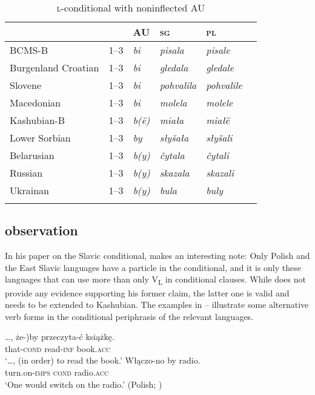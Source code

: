 \documentclass[output=paper]{langscibook}
\begin{document}
\begin{table}[t]
\begin{tabular}{llllll}
\lsptoprule
& & AU & \textsc{sg} & \textsc{pl} \\ 
\midrule 
BCMS-B & 1--3 & \textit{bi} & \textit{pisala} & \textit{pisale} \\
Burgenland Croatian & 1--3 & \textit{bi} & \textit{gledala} & \textit{gledale} \\
Slovene & 1--3 & \textit{bi} & \textit{pohvalila} & \textit{pohvalile} \\
Macedonian & 1--3 & \textit{bi} & \textit{molela} & \textit{molele} \\\addlinespace
Kashubian-B & 1--3 & \textit{b(ë)} & \textit{miała} & \textit{miałë} \\
Lower Sorbian & 1--3 & \textit{by} & \textit{słyšała} & \textit{słyšali} \\\addlinespace
Belarusian & 1--3 & \textit{b(y)} & \textit{čytala} & \textit{čytali} \\
Russian & 1--3 & \textit{b(y)}  & \textit{skazala} & \textit{skazali} \\
Ukrainan & 1--3 & \textit{b(y)} & \textit{bula} & \textit{buly} \\ 
\lspbottomrule
\end{tabular}
    \caption{\textsc{l-}conditional with noninflected AU}
    \label{pitsch:tab:conditional_particle}
\end{table}


\subsection{ observation}

In his paper on the Slavic conditional, \citet[88]{Garde1964} makes an interesting note: Only Polish and the East Slavic languages have a particle in the conditional, and it is only these languages that can use more than only V\textsubscript{L} in conditional clauses. While \citeauthor{Garde1964} does not provide any evidence supporting his former claim, the latter one is valid and needs to be extended to Kashubian. The examples in -- illustrate some alternative verb forms in the conditional periphrasis of the relevant languages.

\ea
\ea\gll \ldots, \minsp{(} że-)by przeczyta-ć książkę. \\
{} {} that-\textsc{cond} read-\textsc{inf} book.\textsc{acc} \\ 
\glt `\ldots, (in order) to read the book.'
\ex\gll Włączo-no by radio. \\
turn.on-\textsc{imps} \textsc{cond} radio.\textsc{acc} \\
\glt `One would switch on the radio.' \hfill \hfill (Polish; \citealt[253]{Migdalski2006})
\z
\label{pitsch:ex:ImpersCond_Polish}
\z
\end{document}
